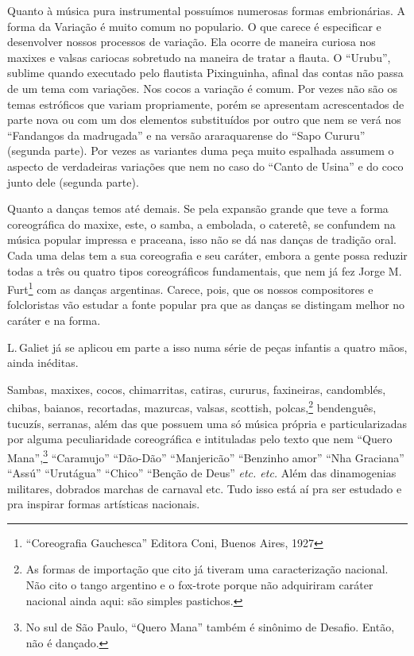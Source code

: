 Quanto à música pura instrumental possuímos numerosas formas
embrionárias. A forma da Variação é muito comum no populario. O que
carece é especificar e desenvolver nossos processos de variação. Ela
ocorre de maneira curiosa nos maxixes e valsas cariocas sobretudo na
maneira de tratar a flauta. O ``Urubu'', sublime quando executado pelo
flautista Pixinguinha, afinal das contas não passa de um tema com
variações. Nos cocos a variação é comum. Por vezes não são os temas
estróficos que variam propriamente, porém se apresentam acrescentados de
parte nova ou com um dos elementos substituídos por outro que nem se
verá nos ``Fandangos da madrugada'' e na versão araraquarense do ``Sapo
Cururu'' (segunda parte). Por vezes as variantes duma peça muito espalhada
assumem o aspecto de verdadeiras variações que nem no caso do ``Canto de
Usina'' e do coco junto dele (segunda parte).

Quanto a danças temos até demais. Se pela expansão grande que teve a
forma coreográfica do maxixe, este, o samba, a embolada, o cateretê, se
confundem na música popular impressa e praceana, isso não se dá nas
danças de tradição oral. Cada uma delas tem a sua coreografia e seu
caráter, embora a gente possa reduzir todas a três ou quatro tipos
coreográficos fundamentais, que nem já fez Jorge M.\,Furt\footnote{``Coreografia
Gauchesca'' Editora Coni, Buenos Aires, 1927} com as danças argentinas.
Carece, pois, que os nossos compositores e folcloristas vão estudar a
fonte popular pra que as danças se distingam melhor no caráter e na
forma.

L.\,Galiet já se aplicou em parte a isso numa série de peças infantis a
quatro mãos, ainda inéditas.

Sambas, maxixes, cocos, chimarritas, catiras, cururus, faxineiras, candomblés,
chibas, baianos, recortadas, mazurcas, valsas, scottish, polcas,\footnote{As formas de importação que cito já tiveram uma caracterização nacional. Não cito o tango argentino e o fox-trote porque não adquiriram caráter nacional ainda aqui: são simples pastichos.}
bendenguês, tucuzís, serranas, além das que possuem uma só
música própria e particularizadas por alguma peculiaridade coreográfica
e intituladas pelo texto que nem ``Quero Mana'',\footnote{No sul de São Paulo, ``Quero Mana'' também é sinônimo de Desafio. Então, não é dançado.}
``Caramujo'' ``Dão-Dão'' ``Manjericão'' ``Benzinho amor'' ``Nha Graciana'' ``Assú''
``Urutágua'' ``Chico'' ``Benção de Deus'' \textit{etc. etc.} Além das dinamogenias
militares, dobrados marchas de carnaval etc. Tudo isso está aí pra ser
estudado e pra inspirar formas artísticas nacionais.

